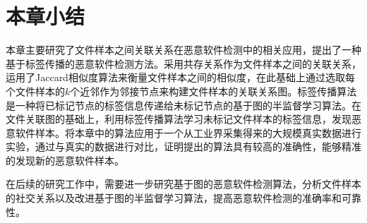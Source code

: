 \section{本章小结}
本章主要研究了文件样本之间关联关系在恶意软件检测中的相关应用，提出了一种基于标签传播的恶意软件检测方法。采用共存关系作为文件样本之间的关联关系，运用了Jaccard相似度算法来衡量文件样本之间的相似度，在此基础上通过选取每个文件样本的$k$个近邻作为邻接节点来构建文件样本的关联关系图。标签传播算法是一种将已标记节点的标签信息传递给未标记节点的基于图的半监督学习算法。在文件关联图的基础上，利用标签传播算法学习未标记文件样本的标签信息，发现恶意软件样本。将本章中的算法应用于一个从工业界采集得来的大规模真实数据进行实验，通过与真实的数据进行对比，证明提出的算法具有较高的准确性，能够精准的发现新的恶意软件样本。

在后续的研究工作中，需要进一步研究基于图的恶意软件检测算法，分析文件样本的社交关系以及改进基于图的半监督学习算法，提高恶意软件检测的准确率和可靠性。